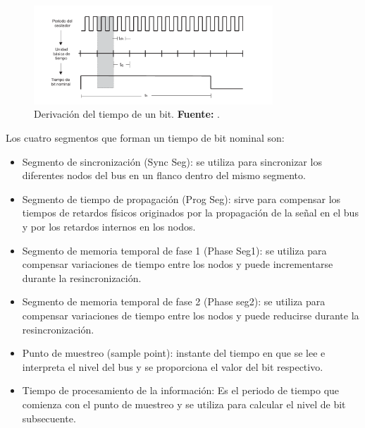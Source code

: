 \begin{figure}[H]
	\centering
		\includegraphics[width=0.8\textwidth]{./Cap2imagen/derivacion_bit.pdf}
	\caption[Derivación del tiempo de un bit.]{Derivación del tiempo de un bit.\textbf{ Fuente:} \cite{DSEEPC}.}
	\label{DB} %
\end{figure}


Los cuatro segmentos que forman un tiempo de bit nominal son:

\begin{itemize} %
\item Segmento de sincronización (Sync Seg): se utiliza para sincronizar los diferentes nodos del bus en un flanco dentro del mismo segmento.
\item Segmento de tiempo de propagación (Prog Seg): sirve para compensar los tiempos de retardos físicos originados por la propagación de la señal en el bus y por los retardos internos en los nodos.
\item Segmento de memoria temporal de fase 1 (Phase Seg1): se utiliza para compensar variaciones de tiempo entre los nodos y puede incrementarse durante la resincronización.
\item Segmento de memoria temporal de fase 2 (Phase seg2): se utiliza para compensar variaciones de tiempo entre los nodos y puede reducirse durante la resincronización.

\item Punto de muestreo (sample point): instante del tiempo en que se lee e interpreta el nivel del bus y se proporciona el valor del bit respectivo.
\item Tiempo de procesamiento de la información: Es el periodo de tiempo que comienza con el punto de muestreo y se utiliza para calcular el nivel de bit subsecuente.
\end{itemize}

